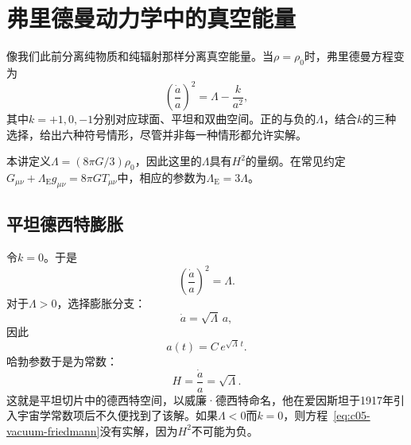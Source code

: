 \begin{classroomqa}
\end{classroomqa}

\section{弗里德曼动力学中的真空能量}

像我们此前分离纯物质和纯辐射那样分离真空能量。当\(\rho=\rho_0\)时，弗里德曼方程变为
\begin{equation}
\left(\frac{\dot a}{a}\right)^2=\Lambda-\frac{k}{a^2},
\label{eq:c05-vacuum-friedmann}
\end{equation}
其中\(k=+1,0,-1\)分别对应球面、平坦和双曲空间。正的与负的\(\Lambda\)，结合\(k\)的三种选择，给出六种符号情形，尽管并非每一种情形都允许实解。

\begin{remark}
本讲定义\(\Lambda=(8\pi G/3)\rho_0\)，因此这里的\(\Lambda\)具有\(H^2\)的量纲。在常见约定\(G_{\mu\nu}+\Lambda_{\mathrm E}g_{\mu\nu}=8\pi G T_{\mu\nu}\)中，相应的参数为\(\Lambda_{\mathrm E}=3\Lambda\)。
\end{remark}

\subsection{平坦德西特膨胀}

令\(k=0\)。于是
\begin{equation}
\left(\frac{\dot a}{a}\right)^2=\Lambda.
\end{equation}
对于\(\Lambda>0\)，选择膨胀分支：
\begin{equation}
\dot a=\sqrt{\Lambda}\,a,
\end{equation}
因此
\begin{equation}
a(t)=C\,e^{\sqrt{\Lambda}\,t}.
\end{equation}
哈勃参数于是为常数：
\begin{equation}
H=\frac{\dot a}{a}=\sqrt{\Lambda}.
\end{equation}
这就是平坦切片中的德西特空间，以威廉·德西特命名，他在爱因斯坦于1917年引入宇宙学常数项后不久便找到了该解。如果\(\Lambda<0\)而\(k=0\)，则方程~\eqref{eq:c05-vacuum-friedmann}没有实解，因为\(H^2\)不可能为负。

